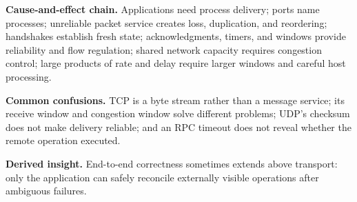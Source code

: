 \documentclass[10pt,letterpaper]{article}
\begin{document}
\begin{overviewbox}\textbf{Cause-and-effect chain.} Applications need process delivery; ports name processes; unreliable packet service creates loss, duplication, and reordering; handshakes establish fresh state; acknowledgments, timers, and windows provide reliability and flow regulation; shared network capacity requires congestion control; large products of rate and delay require larger windows and careful host processing.\par
\textbf{Common confusions.} TCP is a byte stream rather than a message service; its receive window and congestion window solve different problems; UDP's checksum does not make delivery reliable; and an RPC timeout does not reveal whether the remote operation executed.\par
\textbf{Derived insight.} End-to-end correctness sometimes extends above transport: only the application can safely reconcile externally visible operations after ambiguous failures.\end{overviewbox}

\end{document}
